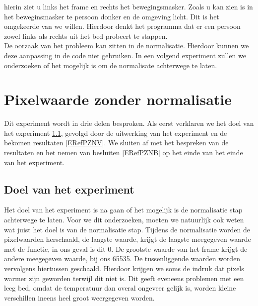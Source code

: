  hierin ziet u links het frame en rechts het bewegingsmasker. Zoals u kan zien is in het beweginsmasker te persoon donker en de omgeving licht. Dit is het omgekeerde van we willen. Hierdoor denkt het programma dat er een persoon zowel links als rechts uit het bed probeert te stappen.\\
 De oorzaak van het probleem kan zitten in de normalisatie. Hierdoor kunnen we deze aanpassing in de code niet gebruiken. In een volgend experiment zullen we onderzoeken of het mogelijk is om de normalisate achterwege te laten. 
 
 \section{Pixelwaarde zonder normalisatie}
 \label{ERefPZN}
 Dit experiment wordt in drie delen besproken. Als eerst verklaren we het doel van het experiment \ref{ERefPZND}, gevolgd door de uitwerking van het experiment en de bekomen resultaten \ref{ERefPZNV}. We sluiten af met het bespreken van de resultaten en het nemen van besluiten \ref{ERefPZNB} op het einde van het einde van het experiment.
 
 \subsection{Doel van het experiment}
 \label{ERefPZND}
 Het doel van het experiment is na gaan of het mogelijk is de normalisatie stap achterwege te laten. Voor we dit onderzoeken, moeten we natuurlijk ook weten wat juist het doel is van de normalisatie stap. Tijdens de normalisatie worden de pixelwaarden herschaald, de laagste waarde, krijgt de laagste meegegeven waarde met de functie, in ons geval is dit 0. De grootste waarde van het frame krijgt de andere meegegeven waarde, bij ons 65535. De tussenliggende waarden worden vervolgens hiertussen geschaald. Hierdoor krijgen we soms de indruk dat pixels warmer zijn geworden terwijl dit niet is. Dit geeft eveneens problemen met een leeg bed, omdat de temperatuur dan overal ongeveer gelijk is, worden kleine verschillen ineens heel groot weergegeven worden. 
 
